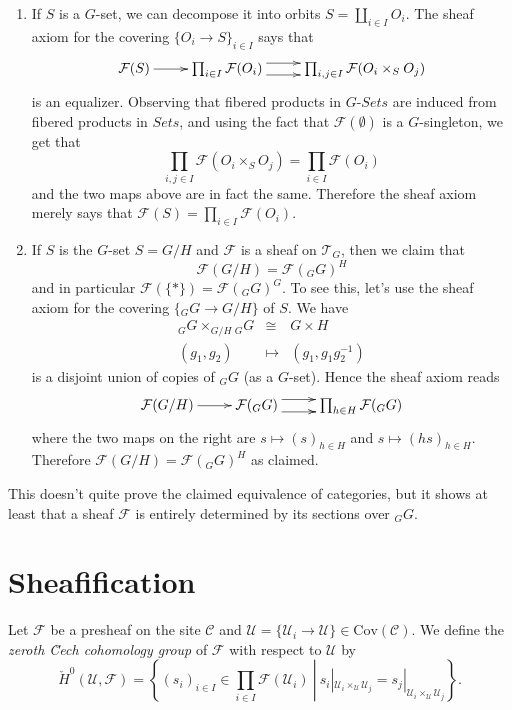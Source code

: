 \begin{enumerate}
\item
If $S$ is a $G$-set, we can decompose it into orbits $S = \coprod_{i\in I}
O_i$. The sheaf axiom for the covering $\{O_i \to S\}_{i\in I}$ says that
$$
\xymatrix{
\mathcal{F}(S) \ar[r] &
\prod_{i\in I} \mathcal{F}(O_i) \ar@<1ex>[r] \ar@<-1ex>[r] &
\prod_{i,j \in I} \mathcal{F}(O_i \times_S O_j)
}
$$
is an equalizer. Observing that fibered products in $G\textit{-Sets}$ are
induced from fibered products in $\textit{Sets}$, and using the fact that
$\mathcal{F}(\emptyset)$ is a $G$-singleton, we get that
$$
\prod_{i,j \in I} \mathcal{F}(O_i \times_S O_j) = \prod_{i \in I}
\mathcal{F}(O_i)
$$
and the two maps above are in fact the same. Therefore the sheaf axiom merely
says that $\mathcal{F}(S) = \prod_{i\in I} \mathcal{F}(O_i)$.
\item
If $S$ is the $G$-set $S= G/H$ and $\mathcal{F}$ is a sheaf on $\mathcal{T}_G$,
then we claim that
$$
\mathcal{F}(G/H) = \mathcal{F}({}_G G)^H
$$
and in particular $\mathcal{F}(\{*\}) = \mathcal{F}({}_G G)^G$. To see this,
let's use the sheaf axiom for the covering $\{ {}_G G \to G/H \}$ of $S$. We
have
\begin{eqnarray*}
{}_G G \times_{G/H} {}_G G & \cong & G \times H \\
(g_1, g_2) & \longmapsto & (g_1, g_1 g_2^{-1})
\end{eqnarray*}
is a disjoint union of copies of ${}_G G$ (as a $G$-set). Hence the sheaf axiom
reads
$$
\xymatrix{
\mathcal{F} (G/H) \ar[r] &
\mathcal{F}({}_G G) \ar@<1ex>[r] \ar@<-1ex>[r] &
\prod_{h\in H} \mathcal{F}({}_G G)
}
$$
where the two maps on the right are $s \mapsto (s)_{h \in H}$ and $s \mapsto
(hs)_{h \in H}$. Therefore $\mathcal{F}(G/H) = \mathcal{F}({}_G G)^H$ as
claimed.
\end{enumerate}
This doesn't quite prove the claimed equivalence of categories, but it shows at
least that a sheaf $\mathcal{F}$ is entirely determined by its sections over
${}_G G$.

\section{Sheafification}
\label{section-sheafification}

\begin{definition}
\label{definition-0-cech}
Let $\mathcal{F}$ be a presheaf on the site $\mathcal{C}$ and
$\mathcal{U} = \{\mathcal{U}_i \to \mathcal{U}\} \in \text{Cov} (\mathcal{C})$.
We define the {\it zeroth \u Cech cohomology group} of
$\mathcal{F}$ with respect to $\mathcal{U}$ by
$$
\check H^0 (\mathcal{U}, \mathcal{F}) =
\left\{\left.
(s_i)_{i\in I} \in \prod_{i\in I }\mathcal{F}(\mathcal{U}_i) \ \right| \ s_i
|_{\mathcal{U}_i \times_\mathcal{U} \mathcal{U}_j} = s_j |_{\mathcal{U}_i
\times_\mathcal{U} \mathcal{U}_j} \right\}.
$$
\end{definition}


